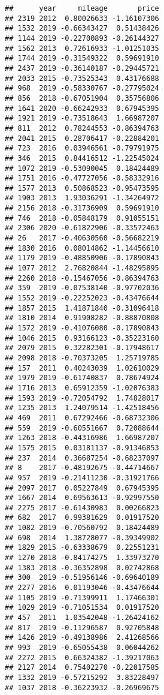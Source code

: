\documentclass[
]{article}
\begin{document}
\begin{verbatim}
##      year     mileage       price
## 2319 2012  0.80026633 -1.16107306
## 1532 2019 -0.66343427  0.51438426
## 1144 2019 -0.22700893 -0.26144327
## 1562 2013  0.72616933 -1.01251035
## 1744 2019 -0.31549322  0.59691910
## 2437 2019 -0.36140187 -0.29445721
## 2033 2015 -0.73525343  0.43176688
## 968  2019 -0.58330767 -0.27795024
## 856  2018 -0.67051904  0.35756806
## 1641 2020 -0.66242933  0.67945395
## 1921 2019 -0.73518643  1.66987207
## 811  2012  0.78244553 -0.86394763
## 2041 2015  0.28706417 -0.22884201
## 723  2016  0.03946561 -0.79791975
## 346  2015  0.84416512 -1.22545024
## 1072 2019 -0.53090045  0.18424489
## 1751 2016 -0.47727056 -0.58332916
## 1577 2013  0.50868523 -0.95473595
## 1903 2013  1.93036291 -1.34264972
## 2156 2018 -0.31736909  0.59691910
## 746  2018 -0.05848179  0.91055151
## 2306 2020 -0.61822906 -0.33572463
## 26   2017 -0.40630560 -0.56682219
## 1830 2016  0.08014862 -1.14456610
## 1179 2019 -0.48850906 -0.17890843
## 1077 2012  2.76820844 -1.48295895
## 2260 2018 -0.15467056 -0.86394763
## 359  2019 -0.07538140 -0.97702036
## 1552 2019 -0.22252023 -0.43476644
## 1857 2015  1.41871840 -0.31096418
## 1810 2014  0.91908282 -0.88870808
## 1572 2019 -0.41076080 -0.17890843
## 1046 2015  0.93166123 -0.35223160
## 2079 2015  0.32282301 -0.17948617
## 2098 2018 -0.70373205  1.25719785
## 157  2011  0.40243039  1.02610029
## 1979 2019 -0.61740837  0.78674924
## 1716 2013  0.65912359 -1.02076383
## 1593 2019 -0.72054792  1.74828017
## 1235 2013  1.24079514 -1.42518456
## 469  2011  0.67292466 -0.68732306
## 559  2019 -0.60551667  0.72088644
## 1263 2018 -0.44316986  1.66987207
## 1575 2015  0.03181137 -0.91346853
## 237  2014  0.36687254 -0.68237097
## 8    2017 -0.48192675 -0.44714667
## 957  2019 -0.21411230 -0.31921766
## 2097 2017  0.05227849  0.67945395
## 1667 2014  0.69563613 -0.92997550
## 2275 2017 -0.61430983  0.00266823
## 682  2017  0.99381629  0.01917520
## 1082 2019 -0.70560792  0.18424489
## 698  2014  1.38728077 -0.39349902
## 1829 2015 -0.63338679  0.22551231
## 1270 2018 -0.84174275  1.33973270
## 1383 2018 -0.36352898  0.02742868
## 300  2019 -0.51956146 -0.69640189
## 2277 2016  0.01193046 -0.43476644
## 1105 2019 -0.71399911  1.17466301
## 1029 2019 -0.71051534  0.01917520
## 457  2011  1.03542048 -1.26424162
## 817  2019 -0.11296587  0.92705848
## 1426 2019 -0.49138986  2.41268566
## 993  2019 -0.65055438  0.06044262
## 2272 2015  0.66324382 -1.39217063
## 2127 2014  0.75402270 -0.22017585
## 1332 2019 -0.57215292  3.83228497
## 1037 2018 -0.36223932 -0.26969675

\end{verbatim}
\end{document}

